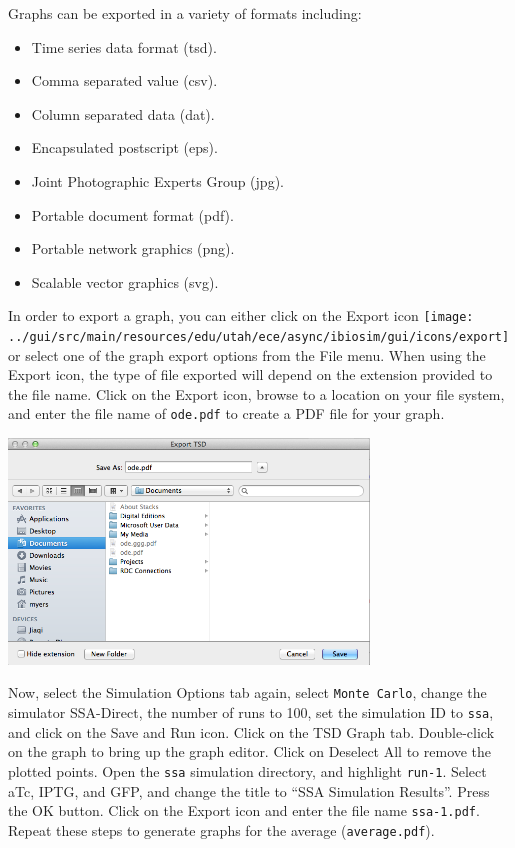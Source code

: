 \documentclass[titlepage,11pt]{article}
\begin{document}
Graphs can be exported in a variety of formats including:
\begin{itemize}
\item Time series data format (tsd).
\item Comma separated value (csv).
\item Column separated data (dat).
\item Encapsulated postscript (eps). 
\item Joint Photographic Experts Group (jpg). 
\item Portable document format (pdf).
\item Portable network graphics (png). 
\item Scalable vector graphics (svg).
\end{itemize}
In order to export a graph, you can either click on the Export icon \texttt{[image: ../gui/src/main/resources/edu/utah/ece/async/ibiosim/gui/icons/export]} or select one of the graph export options from the File menu.  When using the Export icon, the type of file exported will depend on the extension provided to the file name.  Click on the Export icon, browse to a location on your file system, and enter the file name of {\tt ode.pdf} to create a PDF file for your graph.

\begin{center}
\includegraphics[height=60mm]{screenshots/exportTSD}
\end{center}

Now, select the Simulation Options tab again, select {\tt Monte Carlo}, change the simulator SSA-Direct, the number of runs to 100, set the simulation ID to {\tt ssa}, and click on the Save and Run icon.  Click on the TSD Graph tab.  Double-click on the graph to bring up the graph editor.  Click on Deselect All to remove the plotted points.  Open the {\tt ssa} simulation directory, and highlight {\tt run-1}.  Select aTc, IPTG, and GFP, and change the title to ``SSA Simulation Results''. Press the OK button.  Click on the Export icon and enter the file name {\tt ssa-1.pdf}.  Repeat these steps to generate graphs for the average ({\tt average.pdf}).
\end{document}
